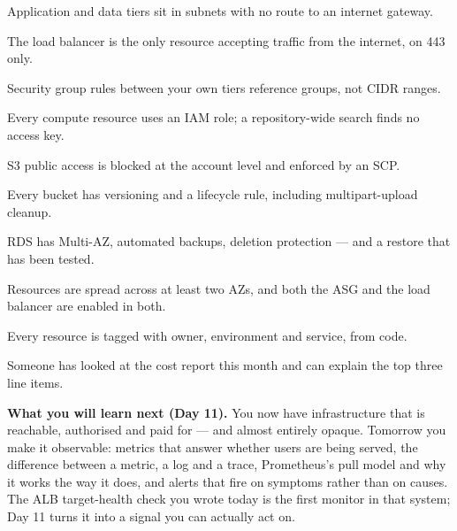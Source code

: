 \begin{checklist}
  \item Application and data tiers sit in subnets with no  route to an internet gateway.
  \item The load balancer is the only resource accepting traffic from the internet, on 443 only.
  \item Security group rules between your own tiers reference groups, not CIDR ranges.
  \item Every compute resource uses an IAM role; a repository-wide search finds no access key.
  \item S3 public access is blocked at the account level and enforced by an SCP.
  \item Every bucket has versioning and a lifecycle rule, including multipart-upload cleanup.
  \item RDS has Multi-AZ, automated backups, deletion protection --- and a restore that has been tested.
  \item Resources are spread across at least two AZs, and both the ASG and the load balancer are enabled in both.
  \item Every resource is tagged with owner, environment and service, from code.
  \item Someone has looked at the cost report this month and can explain the top three line items.
\end{checklist}

\begin{keyidea}
\textbf{What you will learn next (Day 11).} You now have infrastructure that is reachable, authorised and paid for --- and almost entirely opaque. Tomorrow you make it observable: metrics that answer whether users are being served, the difference between a metric, a log and a trace, Prometheus's pull model and why it works the way it does, and alerts that fire on symptoms rather than on causes. The ALB target-health check you wrote today is the first monitor in that system; Day 11 turns it into a signal you can actually act on.
\end{keyidea}
